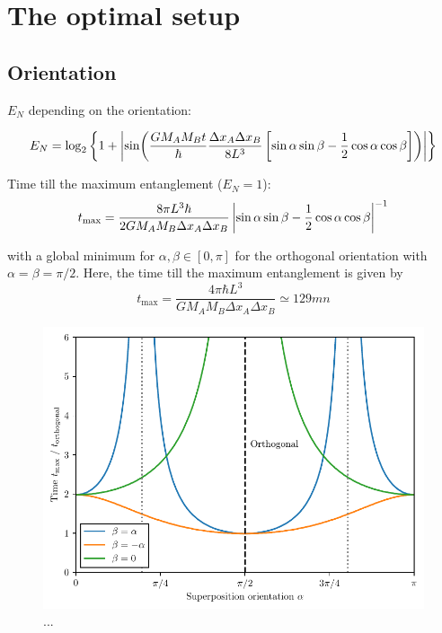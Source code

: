 \chapter{The optimal setup}\label{cha:the-optimal-setup}



\section{Orientation}
$E_N$ depending on the orientation:

\begin{equation}
  E_N = \log_2\left\{
    1 + \left\lvert
      \sin(
      \frac{G M_A M_B t}{\hbar} \frac{\Delta x_A \Delta x_B}{8L^3}
      \left[ \sin\alpha\sin\beta - \frac{1}{2}\cos\alpha\cos\beta \right]
      )
      \right\rvert
  \right\}
\end{equation}

Time till the maximum entanglement ($E_N = 1$):
\begin{equation}
  t_\mathrm{max} = \frac{8 \pi L^3 \hbar}{2 G M_A M_B \Delta x_A\Delta x_B} \left\lvert\sin\alpha\sin\beta - \frac{1}{2}\cos\alpha\cos\beta\right\rvert^{-1}
\end{equation}

with a global minimum for $\alpha,\beta \in [0, \pi]$ for the orthogonal orientation with $\alpha = \beta = \pi/2$. Here, the time till the maximum entanglement is given by
\begin{equation}
  t_\mathrm{max} = \frac{4 \pi \hbar L^3}{G M_A M_B \Delta x_A \Delta x_B} \simeq 129\si{mn}
\end{equation}

\begin{figure}[!htbp]
  \centering
  \includegraphics[width=\textwidth]{./../figures/EN-orientation.pdf}
  \caption{...}
  \label{fig:5:optimal-orientation}
\end{figure}



